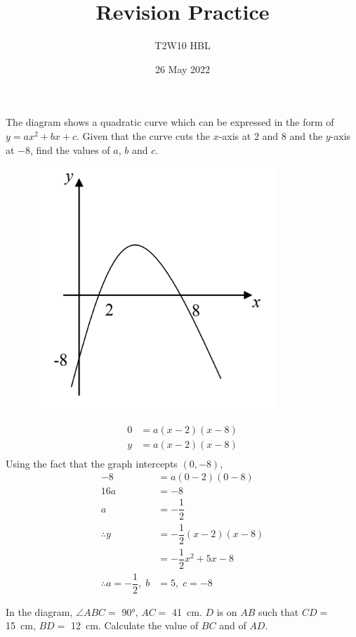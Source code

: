 \documentclass[12pt, answers]{exam}
\title{Revision Practice}
\author{T2W10 HBL}
\date{26 May 2022}
\renewcommand{\half}{\dfrac{1}{2}}
\newcommand{\cm}{\centi\metre}
\begin{document}
\maketitle

\begin{questions}
\question The diagram shows a quadratic curve which can be expressed in the form of $y = ax^2 + bx + c$.
Given that the curve cuts the $x$-axis at $2$ and $8$ and the $y$-axis at $-8$,
find the values of $a$, $b$ and $c$.

\begin{figure}[htpb]
    \centering
    \includegraphics{graphq1.png}
    \label{fig:q1}
\end{figure}

\begin{solution}
\begin{align*}
    0 &= a(x - 2)(x - 8) \\
    y &= a(x - 2)(x - 8) \\
\end{align*}
Using the fact that the graph intercepts $(0, -8)$,
\begin{align*}
    -8 &= a(0 - 2)(0 - 8) \\
    16a &= -8 \\
    a &= -\half \\
    \therefore y &= -\half(x - 2)(x - 8) \\
    &= -\half x^2 + 5x - 8 \\
    \therefore a = -\half,\; b &= 5,\; c = -8
\end{align*}
\end{solution}

\question In the diagram, $\angle ABC = $ \ang{90},
$AC = $ \qty{41}{\cm}. $D$ is on $AB$ such that $CD = $ \qty{15}{\cm}, $BD = $ \qty{12}{\cm}.
Calculate the value of $BC$ and of $AD$.


\end{questions}
\end{document}
